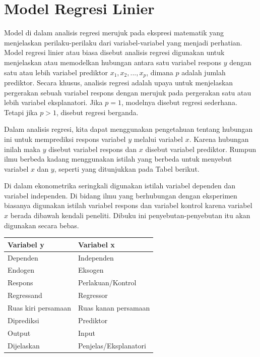 \documentclass[
]{book}
\begin{document}
\hypertarget{model-regresi-linier}{%
\section{Model Regresi Linier}\label{model-regresi-linier}}

Model di dalam analisis regresi merujuk pada ekspresi matematik yang
menjelaskan perilaku-perilaku dari variabel-variabel yang menjadi
perhatian. Model regresi linier atau biasa disebut analisis regresi
\citep{faraway2015b} digunakan untuk menjelaskan atau memodelkan hubungan
antara satu variabel respons \(y\) dengan satu atau lebih variabel
prediktor \(x_1, x_2, ... , x_p\), dimana \(p\) adalah jumlah prediktor.
Secara khusus, analisis regresi adalah upaya untuk menjelaskan
pergerakan sebuah variabel respons dengan merujuk pada pergerakan satu
atau lebih variabel eksplanatori. Jika \(p=1\), modelnya disebut regresi
sederhana. Tetapi jika \(p>1\), disebut regresi berganda.

Dalam analisis regresi, kita dapat menggunakan pengetahuan tentang
hubungan ini untuk memprediksi respons variabel \(y\) melalui variabel
\(x\). Karena hubungan inilah maka \(y\) disebut variabel respons dan \(x\)
disebut variabel prediktor. Rumpun ilmu berbeda kadang menggunakan
istilah yang berbeda untuk menyebut variabel \(x\) dan \(y\), seperti yang ditunjukkan pada Tabel berikut.

Di dalam ekonometrika seringkali digunakan istilah variabel
dependen dan variabel independen. Di bidang ilmu yang berhubungan dengan
eksperimen biasanya digunakan istilah variabel respons dan variabel
kontrol karena variabel \(x\) berada dibawah kendali peneliti. Dibuku ini
penyebutan-penyebutan itu akan digunakan secara bebas.

\begin{table}
\centering
\begin{tabular}[t]{l|l}
\hline
Variabel y & Variabel x\\
\hline
Dependen & Independen\\
\hline
Endogen & Eksogen\\
\hline
Respons & Perlakuan/Kontrol\\
\hline
Regressand & Regressor\\
\hline
Ruas kiri persamaan & Ruas kanan persamaan\\
\hline
Diprediksi & Prediktor\\
\hline
Output & Input\\
\hline
Dijelaskan & Penjelas/Eksplanatori\\
\hline
\end{tabular}
\end{table}
\end{document}
